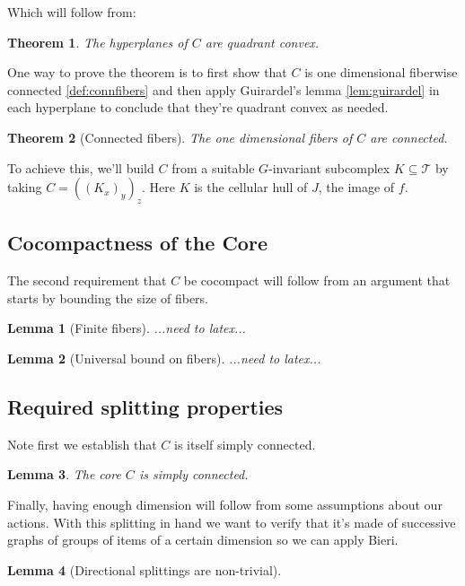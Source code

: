 \documentclass{article}
\newcommand{\sxyz}{((K_x)_y)_z}
\theoremstyle{mystyle}
\newtheorem{thm}{Theorem}[section]
\newtheorem{lem}{Lemma}[section]
\theoremstyle{remark}
\begin{document}
Which will follow from:

\begin{thm}
    The hyperplanes of \(C\) are quadrant convex.    
\end{thm}

One way to prove the theorem is to first show that \(C\) is one dimensional fiberwise connected \ref{def:connfibers} and then apply Guirardel's lemma \ref{lem:guirardel} in each hyperplane to conclude that they're quadrant convex as needed.

\begin{thm}
    [Connected fibers]
    The one dimensional fibers of \(C\) are connected.
\end{thm}


To achieve this, we'll build \(C\) from a suitable \(G\)-invariant subcomplex \(K \subseteq \mathscr{T} \) by taking \(C = \sxyz\).  Here \(K\) is the cellular hull of \(J\), the image of \(f\). 




\subsection{Cocompactness of the Core}
The second requirement that \(C\) be cocompact will follow from an argument that starts by bounding the size of fibers. 
 \begin{lem}
     [Finite fibers]
     ...need to latex...
 \end{lem}

 \begin{lem}
     [Universal bound on fibers]
     ...need to latex...
 \end{lem}


\subsection{Required splitting properties}
Note first we establish that \(C\) is itself simply connected.
\begin{lem}
    The core \(C\) is simply connected.
\end{lem}

Finally, having enough dimension will follow from some assumptions about our actions.
With this splitting in hand we want to verify that it's made of successive graphs of groups of items of a certain dimension so we can apply Bieri.

\begin{lem}
    [Directional splittings are non-trivial]
\end{lem}
\end{document}

